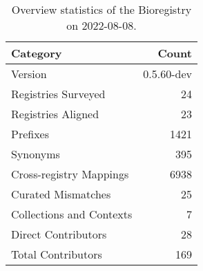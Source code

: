 \begin{table}
\centering
\caption{Overview statistics of the Bioregistry on 2022-08-08.}
\label{tab:bioregistry-summary}
\begin{tabular}{lr}
\toprule
                Category &      Count \\
\midrule
                 Version & 0.5.60-dev \\
     Registries Surveyed &         24 \\
      Registries Aligned &         23 \\
                Prefixes &       1421 \\
                Synonyms &        395 \\
 Cross-registry Mappings &       6938 \\
      Curated Mismatches &         25 \\
Collections and Contexts &          7 \\
     Direct Contributors &         28 \\
      Total Contributors &        169 \\
\bottomrule
\end{tabular}
\end{table}
